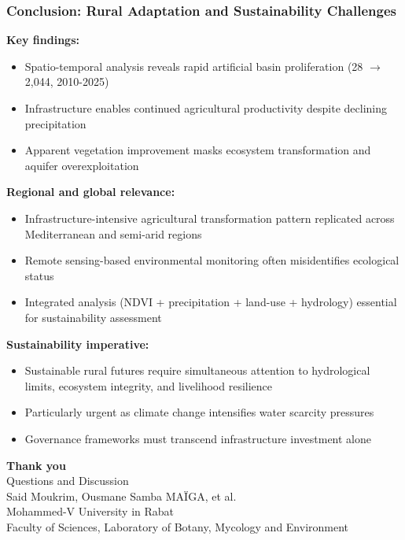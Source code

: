 \documentclass{beamer}
\begin{document}
\begin{frame}
\frametitle{Conclusion: Rural Adaptation and Sustainability Challenges}

\textbf{Key findings:}
\begin{itemize}
  \item Spatio-temporal analysis reveals rapid artificial basin proliferation (28 $\to$ 2,044, 2010-2025)
  \item Infrastructure enables continued agricultural productivity despite declining precipitation
  \item Apparent vegetation improvement masks ecosystem transformation and aquifer overexploitation
\end{itemize}

\vspace{0.3cm}

\textbf{Regional and global relevance:}
\begin{itemize}
  \item Infrastructure-intensive agricultural transformation pattern replicated across Mediterranean and semi-arid regions
  \item Remote sensing-based environmental monitoring often misidentifies ecological status
  \item Integrated analysis (NDVI + precipitation + land-use + hydrology) essential for sustainability assessment
\end{itemize}

\vspace{0.3cm}

\textbf{Sustainability imperative:}
\begin{itemize}
  \item Sustainable rural futures require simultaneous attention to hydrological limits, ecosystem integrity, and livelihood resilience
  \item Particularly urgent as climate change intensifies water scarcity pressures
  \item Governance frameworks must transcend infrastructure investment alone
\end{itemize}

\end{frame}

\begin{frame}[plain]
\begin{center}
  \vfill
  {\Huge \textbf{Thank you}}
  \\[1cm]
  {\Large Questions and Discussion}
  \\[2cm]
  \small{
    Said Moukrim, Ousmane Samba MAÏGA, et al. \\
    Mohammed-V University in Rabat \\
    Faculty of Sciences, Laboratory of Botany, Mycology and Environment
  }
  \vfill
\end{center}
\end{frame}
\end{document}
